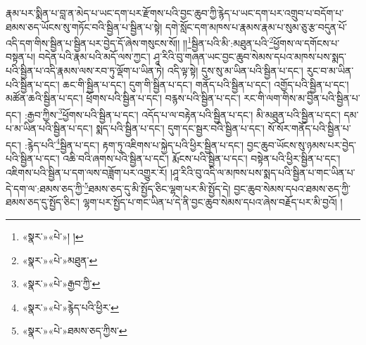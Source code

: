 རྣམ་པར་སྨིན་པ་བླ་ན་མེད་པ་ཡང་དག་པར་རྫོགས་པའི་བྱང་ཆུབ་ཀྱི་རྙེད་པ་ཡང་དག་པར་འགྲུབ་པ་བདོག་པ་ཐམས་ཅད་ཡོངས་སུ་གཏོང་བའི་སྦྱིན་པ་སྦྱིན་པ་སྟེ། དགེ་སློང་དག་མཁས་པ་རྣམས་རྣམ་པ་སུམ་ཅུ་རྩ་བདུན་པོ་འདི་དག་གིས་སྦྱིན་པ་སྦྱིན་པར་བྱེད་དོ་ཞེས་གསུངས་སོ།། །།\footnote{«སྣར་»«པེ་»། །}སྦྱིན་པའི་མི་:མཐུན་པའི་\footnote{«སྣར་»«པེ་»མཐུན་}ཕྱོགས་ལ་དགོངས་པ་བསྟན་པ། བདེན་པའི་རྣམ་པའི་མདོ་ལས་ཀྱང་། ཤཱ་རིའི་བུ་གཞན་ཡང་བྱང་ཆུབ་སེམས་དཔའ་མཁས་པས་སྨད་པའི་སྦྱིན་པ་འདི་རྣམས་ལས་རབ་ཏུ་ལྡོག་པ་ཡིན་ཏེ། འདི་ལྟ་སྟེ། དུས་སུ་མ་ཡིན་པའི་སྦྱིན་པ་དང་། རུང་བ་མ་ཡིན་པའི་སྦྱིན་པ་དང་། ཆང་གི་སྦྱིན་པ་དང་། དུག་གི་སྦྱིན་པ་དང་། གནོད་པའི་སྦྱིན་པ་དང་། འགྱོད་པའི་སྦྱིན་པ་དང་། མཚོན་ཆའི་སྦྱིན་པ་དང་། ཕྲོགས་པའི་སྦྱིན་པ་དང་། བརྙས་པའི་སྦྱིན་པ་དང་། རང་གི་ལག་གིས་མ་བྱིན་པའི་སྦྱིན་པ་དང་། :རྒྱབ་ཀྱིས་\footnote{«སྣར་»«པེ་»རྒྱབ་ཀྱི་}ཕྱོགས་པའི་སྦྱིན་པ་དང་། འདོད་པ་ལ་བརྟེན་པའི་སྦྱིན་པ་དང་། མི་མཐུན་པའི་སྦྱིན་པ་དང་། དམ་པ་མ་ཡིན་པའི་སྦྱིན་པ་དང་། སྨད་པའི་སྦྱིན་པ་དང་། དུག་དང་སྦྱར་བའི་སྦྱིན་པ་དང་། སོ་སོར་གནོད་པའི་སྦྱིན་པ་དང་། :རྙེད་པའི་\footnote{«སྣར་»«པེ་»རྙེད་པའི་ཕྱིར་}སྦྱིན་པ་དང་། རྟག་ཏུ་འཇིགས་པ་སྐྱེད་པའི་ཕྱིར་སྦྱིན་པ་དང་། བྱང་ཆུབ་ཡོངས་སུ་ཉམས་པར་བྱེད་པའི་སྦྱིན་པ་དང་། འཆི་བའི་ཞགས་པའི་སྦྱིན་པ་དང་། རྨོངས་པའི་སྦྱིན་པ་དང་། བསྟེན་པའི་ཕྱིར་སྦྱིན་པ་དང་། འཇིགས་པའི་སྦྱིན་པ་དག་ལས་བཟློག་པར་འགྱུར་རོ། །ཤཱ་རིའི་བུ་འདི་ལ་མཁས་པས་སྨད་པའི་སྦྱིན་པ་གང་ཡིན་པ་དེ་དག་ལ་:ཐམས་ཅད་ཀྱི་\footnote{«སྣར་»«པེ་»ཐམས་ཅད་ཀྱིས་}ཐམས་ཅད་དུ་མི་སྤྱོད་ཅིང་ལྷག་པར་མི་སྤྱོད་དེ། བྱང་ཆུབ་སེམས་དཔའ་ཐམས་ཅད་ཀྱི་ཐམས་ཅད་དུ་སྤྱོད་ཅིང་། ལྷག་པར་སྤྱོད་པ་གང་ཡིན་པ་དེ་ནི་བྱང་ཆུབ་སེམས་དཔའ་ཞེས་བརྗོད་པར་མི་བྱའོ། །
